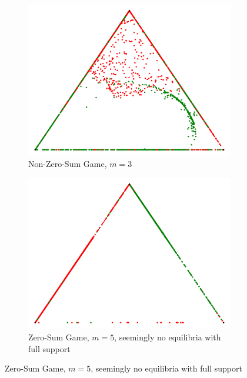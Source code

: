 \documentclass[a4paper]{scrreprt}
\begin{document}
\begin{figure}[h]
        \begin{subfigure}[t]{0.49\textwidth}
            \includegraphics[width=\textwidth]{Pictures/paretoNash-bimatrix-k3.pdf}
            \caption{Non-Zero-Sum Game, $m=3$}
        \end{subfigure}
        \begin{subfigure}[t]{0.49\textwidth}
            \includegraphics[width=\textwidth]{Pictures/paretoNash-emptyCenter-k5.pdf}
            \caption{Zero-Sum Game, $m=5$, seemingly no equilibria with full support}
        \end{subfigure}
%        

\end{figure}
\end{document}
